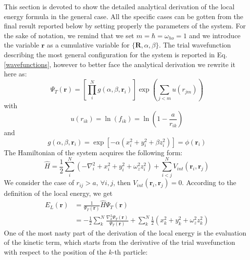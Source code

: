 This section is devoted to show the detailed analytical derivation of the local energy formula in the general case. All the specific cases can be gotten from the final result reported below by setting properly the parameters of the system. For the sake of notation, we remind that we set $m=\hbar=\omega_{ho}=1$ and we introduce the variable $\bm{r}$ as a cumulative variable for $\{\bm{R}, \alpha, \beta\}$. The trial wavefunction describing the most general configuration for the system is reported in Eq.\,\ref{wavefunctions}, however to better face the analytical derivation we rewrite it here as:
\begin{equation*}
    \Psi_T(\mathbf{r} )=\left[ \prod_i^N g(\alpha,\beta,\mathbf{r}_i) \right] \exp{\left(\sum_{j<m}u(r_{jm})\right)}
\end{equation*} 
with 
\begin{equation}
    u(r_{ik})=\ln (f_{ik}) = \ln \left( 1-\frac{a}{r_{ik}} \right)
    \label{app:u_interaction}
\end{equation}
and
\begin{equation}
    g(\alpha,\beta,\mathbf{r}_i) = \exp{\left[-\alpha(x_i^2+y_i^2+\beta
    z_i^2)\right]}= \phi(\mathbf{r}_i)
    \label{app:gaussian}
\end{equation} 
The Hamiltonian of the system acquires the following form: 
\begin{equation*}
    \hat{H} = \frac{1}{2} \sum_i^N \left( - \nabla_{i}^2 + x_i^2 + y_i^2 +  \omega_{z}^2 z_i^2 \right) 
    +\sum_{i<j}^{N} V_{int}({\mathbf{r}}_i,{\mathbf{r}}_j)
\end{equation*}
We consider the %
case of $r_{ij}>a,\, \forall i,j$, then  $V_{int}(\mathbf{r}_i,\mathbf{r}_j) = 0$. According to the definition of the local energy, we get
\begin{align}
    E_L(\mathbf{r}) &= \frac{1}{\Psi_T(\mathbf{r})} \hat{H} \Psi_T(\mathbf{r}) \nonumber\\
    &= -\frac{1}{2} \sum_k^N  \frac{\nabla_{k}^2\Psi_T(\mathbf{r})}{{\Psi_T(\mathbf{r})}} +\sum_k^N \frac{1}{2} \left(x_k^2 + y_k^2 + \omega_{z}^2 z_k^2 \right) 
    \label{app:localenergy_appendix}
\end{align}
One of the most nasty part of the derivation of the local energy is the evaluation of the kinetic term, which starts from the derivative of the trial wavefunction with respect to the position of the $k$-th particle: 
